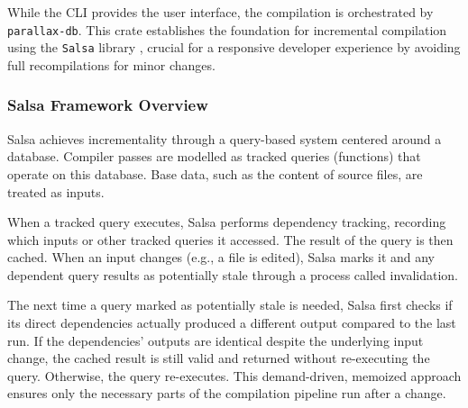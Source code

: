 While the CLI provides the user interface, the compilation is orchestrated by \texttt{parallax-db}. This crate establishes the foundation for incremental compilation using the \texttt{Salsa} library \cite{Salsa}, crucial for a responsive developer experience by avoiding full recompilations for minor changes.

\subsubsection{Salsa Framework Overview}

Salsa \cite{Salsa} achieves incrementality through a query-based system centered around a database. Compiler passes are modelled as tracked queries (functions) that operate on this database. Base data, such as the content of source files, are treated as inputs. 

When a tracked query executes, Salsa performs dependency tracking, recording which inputs or other tracked queries it accessed. The result of the query is then cached. When an input changes (e.g., a file is edited), Salsa marks it and any dependent query results as potentially stale through a process called invalidation. 

The next time a query marked as potentially stale is needed, Salsa first checks if its direct dependencies actually produced a different output compared to the last run. If the dependencies' outputs are identical despite the underlying input change, the cached result is still valid and returned without re-executing the query. Otherwise, the query re-executes. This demand-driven, memoized approach ensures only the necessary parts of the compilation pipeline run after a change.

